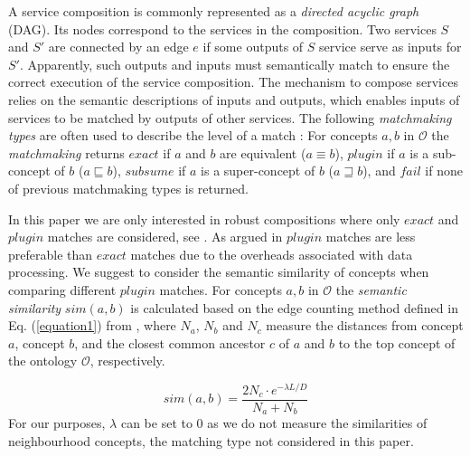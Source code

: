 \documentclass{llncs}
\begin{document}
A service composition is commonly represented as a \emph{directed acyclic graph} (DAG). Its nodes correspond to the services in the composition. Two services $S$ and $S'$ are connected by an edge $e$ if some outputs of $S$ service serve as inputs for $S'$. Apparently, such outputs and inputs must semantically match to ensure the correct execution of the service composition. The mechanism to compose services relies on the semantic descriptions of inputs and outputs, which enables inputs of services to be matched by outputs of other services. The following \emph{matchmaking types} are often used to describe the level of a match \cite{paolucci2002semantic}: For concepts $a, b$ in $\mathcal{O}$ the \emph{matchmaking} returns $exact$ if $a$ and $b$ are equivalent ($a \equiv b$), $plugin$ if $a$ is a sub-concept of $b$ ($a \sqsubseteq b$), $subsume$ if $a$ is a super-concept of $b$ ($a \sqsupseteq b$), and $fail$ if none of previous matchmaking types is returned.

In this paper we are only interested in robust compositions where only $exact$ and $plugin$ matches are considered, see \cite{lecue2009optimizing}. As argued in \cite{lecue2009optimizing} $plugin$ matches are less preferable than $exact$ matches due to the overheads associated with data processing. We suggest to consider the semantic similarity of concepts when comparing different $plugin$ matches. For concepts $a, b$ in $\mathcal{O}$ the \emph{semantic similarity} $sim(a, b)$ is calculated based on the edge counting method defined in Eq. (\ref{equation1}) from \cite{shet2012new}, where $N_a$, $N_b$ and $N_c$ measure the distances from concept $a$, concept $b$, and the closest common ancestor $c$ of $a$ and $b$ to the top concept of the ontology $\mathcal{O}$, respectively. 
\vspace{-0.2cm}

\begin{equation}
sim(a, b){=} \frac{2N_c \cdot e^{-\lambda L/D} }{N_{a}+N_{b}}
\label{equation1}
\end{equation}
\noindent For our purposes, $\lambda$ can be set to 0 as we do not measure the similarities of neighbourhood concepts, the matching type not considered in this paper. 
\end{document}
